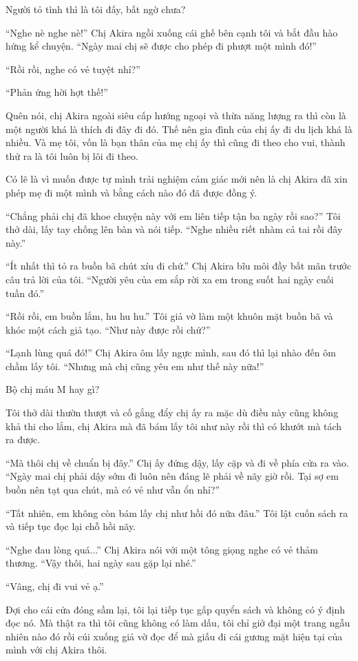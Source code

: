{Người tỏ tình thì là tôi đấy, bất ngờ chưa?

``Nghe nè nghe nè!'' Chị Akira ngồi xuống cái ghế bên cạnh tôi và bắt
đầu hào hứng kể chuyện. ``Ngày mai chị sẽ được cho phép đi phượt một
mình đó!''

``Rồi rồi, nghe có vẻ tuyệt nhỉ?''

``Phản ứng hời hợt thế!''

Quên nói, chị Akira ngoài siêu cấp hướng ngoại và thừa năng lượng ra thì
còn là một người khá là thích đi đây đi đó. Thế nên gia đình của chị ấy
đi du lịch khá là nhiều. Và mẹ tôi, vốn là bạn thân của mẹ chị ấy thì
cũng đi theo cho vui, thành thử ra là tôi luôn bị lôi đi theo.

Có lẽ là vì muốn được tự mình trải nghiệm cảm giác mới nên là chị Akira
đã xin phép mẹ đi một mình và bằng cách nào đó đã được đồng ý.

``Chẳng phải chị đã khoe chuyện này với em liên tiếp tận ba ngày rồi
sao?'' Tôi thở dài, lấy tay chống lên bàn và nói tiếp. ``Nghe nhiều riết
nhàm cả tai rồi đây này.''

``Ít nhất thì tỏ ra buồn bã chút xíu đi chứ.'' Chị Akira bĩu môi đầy bất
mãn trước câu trả lời của tôi. ``Người yêu của em sắp rời xa em trong
suốt hai ngày cuối tuần đó.''

``Rồi rồi, em buồn lắm, hu hu hu.'' Tôi giả vờ làm một khuôn mặt buồn bã
và khóc một cách giả tạo. ``Như này được rồi chứ?''

``Lạnh lùng quá đó!'' Chị Akira ôm lấy ngực mình, sau đó thì lại nhào
đến ôm chầm lấy tôi. ``Nhưng mà chị cũng yêu em như thế này nữa!''

Bộ chị máu M hay gì?

Tôi thở dài thườn thượt và cố gắng đẩy chị ấy ra mặc dù điều này cũng
không khả thi cho lắm, chị Akira mà đã bám lấy tôi như này rồi thì có
khướt mà tách ra được.

``Mà thôi chị về chuẩn bị đây.'' Chị ấy đứng dậy, lấy cặp và đi về phía
cửa ra vào. ``Ngày mai chị phải dậy sớm đi luôn nên đáng lẽ phải về nãy
giờ rồi. Tại sợ em buồn nên tạt qua chút, mà có vẻ như vẫn ổn nhỉ?''

``Tất nhiên, em không còn bám lấy chị như hồi đó nữa đâu.'' Tôi lật cuốn
sách ra và tiếp tục đọc lại chỗ hồi nãy.

``Nghe đau lòng quá...'' Chị Akira nói với một tông giọng nghe có vẻ
thảm thương. ``Vậy thôi, hai ngày sau gặp lại nhé.''

``Vâng, chị đi vui vẻ ạ.''

Đợi cho cái cửa đóng sầm lại, tôi lại tiếp tục gấp quyển sách và không
có ý định đọc nó. Mà thật ra thì tôi cũng không có làm dấu, tôi chỉ giở
đại một trang ngẫu nhiên nào đó rồi cúi xuống giả vờ đọc để mà giấu đi
cái gương mặt hiện tại của mình với chị Akira thôi.

}
